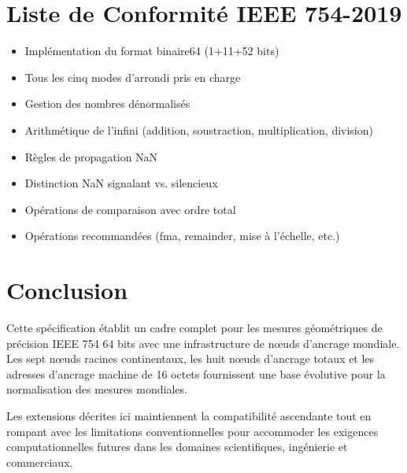 \documentclass[12pt]{book}
\begin{document}
\chapter{Liste de Conformité IEEE 754-2019}

\begin{itemize}
\item Implémentation du format binaire64 (1+11+52 bits)
\item Tous les cinq modes d'arrondi pris en charge
\item Gestion des nombres dénormalisés
\item Arithmétique de l'infini (addition, soustraction, multiplication, division)
\item Règles de propagation NaN
\item Distinction NaN signalant vs. silencieux
\item Opérations de comparaison avec ordre total
\item Opérations recommandées (fma, remainder, mise à l'échelle, etc.)
\end{itemize}

\backmatter

\chapter*{Conclusion}

Cette spécification établit un cadre complet pour les mesures géométriques de précision IEEE 754 64 bits avec une infrastructure de nœuds d'ancrage mondiale. Les sept nœuds racines continentaux, les huit nœuds d'ancrage totaux et les adresses d'ancrage machine de 16 octets fournissent une base évolutive pour la normalisation des mesures mondiales.

Les extensions décrites ici maintiennent la compatibilité ascendante tout en rompant avec les limitations conventionnelles pour accommoder les exigences computationnelles futures dans les domaines scientifiques, ingénierie et commerciaux.
\end{document}
